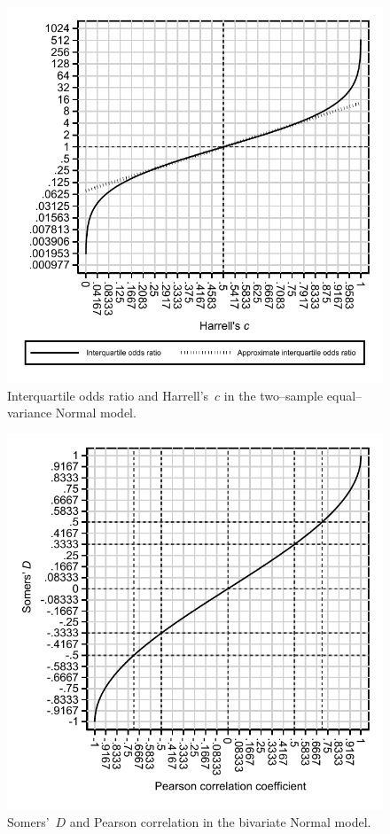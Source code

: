 \documentclass[a4paper,notitlepage]{article}      %
\begin{document}
\begin{figure}[htbp]
\caption{Interquartile odds ratio and Harrell's~$c$ in the two--sample equal--variance Normal model.}
\label{figure:figseq6}
\includegraphics{iqor_c.pdf}
\end{figure}

\begin{figure}[htbp]
\caption{Somers'~$D$ and Pearson correlation in the bivariate Normal model.}
\label{figure:figseq4}
\includegraphics{rho.pdf}
\end{figure}
\end{document}
